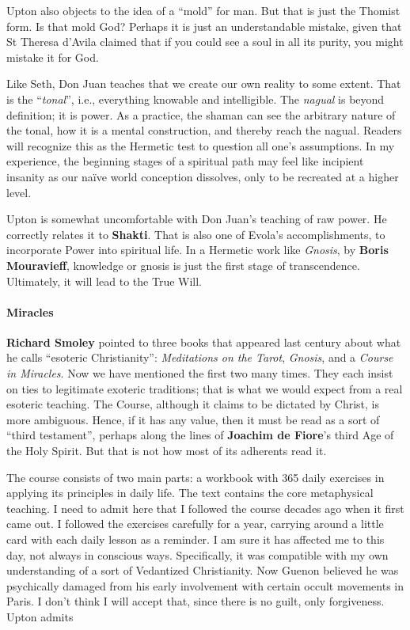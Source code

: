 Upton also objects to the idea of a “mold” for man. But that is just the Thomist form. Is that mold God? Perhaps it is just an understandable mistake, given that St Theresa d'Avila claimed that if you could see a soul in all its purity, you might mistake it for God.

Like Seth, Don Juan teaches that we create our own reality to some extent. That is the “\emph{tonal}”, i.e., everything knowable and intelligible. The \emph{nagual} is beyond definition; it is power. As a practice, the shaman can see the arbitrary nature of the tonal, how it is a mental construction, and thereby reach the nagual. Readers will recognize this as the Hermetic test to question all one's assumptions. In my experience, the beginning stages of a spiritual path may feel like incipient insanity as our naïve world conception dissolves, only to be recreated at a higher level.

Upton is somewhat uncomfortable with Don Juan's teaching of raw power. He correctly relates it to \textbf{Shakti}. That is also one of Evola's accomplishments, to incorporate Power into spiritual life. In a Hermetic work like \emph{Gnosis}, by \textbf{Boris Mouravieff}, knowledge or gnosis is just the first stage of transcendence. Ultimately, it will lead to the True Will.

\paragraph{Miracles}
\textbf{Richard Smoley} pointed to three books that appeared last century about what he calls “esoteric Christianity”: \emph{Meditations on the Tarot}, \emph{Gnosis}, and a \emph{Course in Miracles}. Now we have mentioned the first two many times. They each insist on ties to legitimate exoteric traditions; that is what we would expect from a real esoteric teaching. The Course, although it claims to be dictated by Christ, is more ambiguous. Hence, if it has any value, then it must be read as a sort of “third testament”, perhaps along the lines of \textbf{Joachim de Fiore}'s third Age of the Holy Spirit. But that is not how most of its adherents read it.

The course consists of two main parts: a workbook with 365 daily exercises in applying its principles in daily life. The text contains the core metaphysical teaching. I need to admit here that I followed the course decades ago when it first came out. I followed the exercises carefully for a year, carrying around a little card with each daily lesson as a reminder. I am sure it has affected me to this day, not always in conscious ways. Specifically, it was compatible with my own understanding of a sort of Vedantized Christianity. Now Guenon believed he was psychically damaged from his early involvement with certain occult movements in Paris. I don't think I will accept that, since there is no guilt, only forgiveness. Upton admits

